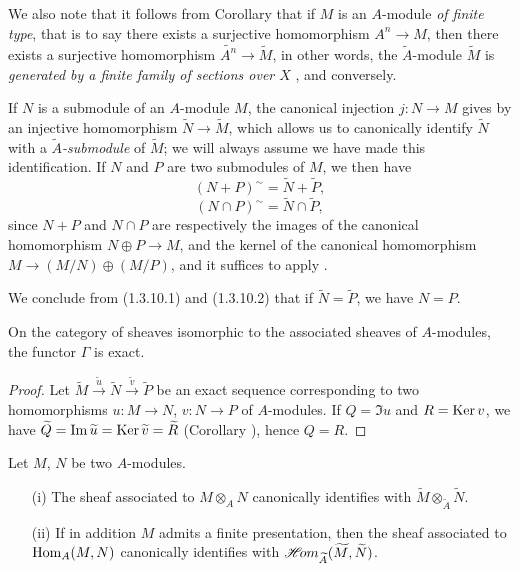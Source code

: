 We also note that it follows from Corollary  that if $M$ is an $A$-module {\em of
finite type}, that is to say there exists a surjective homomorphism $A^n\to M$, then there
exists a surjective homomorphism $\widetilde{A^n}\to\widetilde{M}$, in other words, the
$\widetilde{A}$-module $\widetilde{M}$ is {\em generated by a finite family of sections over
$X$} , and conversely.

\begin{env}[1.3.10]
\label{1.1.3.10}
If $N$ is a submodule of an $A$-module $M$, the canonical injection $j:N\to M$ gives by
 an injective homomorphism $\widetilde{N}\to\widetilde{M}$, which allows us
to canonically identify $\widetilde{N}$ with a {\em $\widetilde{A}$-submodule} of
$\widetilde{M}$; we will always assume we have made this identification. If $N$ and $P$ are
two submodules of $M$, we then have
\[
  (N+P)^\sim=\widetilde{N}+\widetilde{P},
  \tag{1.3.10.1}
\]
\[
  (N\cap P)^\sim=\widetilde{N}\cap\widetilde{P},
  \tag{1.3.10.2}
\]
since $N+P$ and $N\cap P$ are respectively the images of the canonical homomorphism
$N\oplus P\to M$, and the kernel of the canonical homomorphism $M\to(M/N)\oplus(M/P)$, and
it suffices to apply .

We conclude from (1.3.10.1) and (1.3.10.2) that if $\widetilde{N}=\widetilde{P}$, we have
$N=P$.
\end{env}

\begin{cor}[1.3.11]
\label{1.1.3.11}
On the category of sheaves isomorphic to the associated sheaves of $A$-modules, the functor
$\Gamma$ is exact.
\end{cor}

\begin{proof}
\label{proof-1.1.3.11}
Let $\widetilde{M}\xrightarrow{\widetilde{u}}\widetilde{N}
\xrightarrow{\widetilde{v}}\widetilde{P}$ be an exact sequence corresponding to two
homomorphisms $u:M\to N$, $v:N\to P$ of $A$-modules. If $Q=\Im u$ and $R={\mathop{\mathrm{Ker}}\nolimits}\, v$, we have
$\widetilde{Q}={\mathop{\mathrm{Im}}\nolimits}\,\widetilde{u}={\mathop{\mathrm{Ker}}\nolimits}\,\widetilde{v}=\widetilde{R}$ (Corollary ),
hence $Q=R$.
\end{proof}

\begin{cor}[1.3.12]
\label{1.1.3.12}
Let $M$, $N$ be two $A$-modules.
\begin{itemize}
  \item[{\rm(i)}] The sheaf associated to $M\otimes_A N$ canonically identifies with
    $\widetilde{M}\otimes_{\widetilde{A}}\widetilde{N}$.
  \item[{\rm(ii)}] If in addition $M$ admits a finite presentation, then the sheaf associated to
    ${\mathop{\mathrm{Hom}}\nolimits}_A(M,N)$ canonically identifies with $\mathscr{H}\!{om}_{\widetilde{A}}(\widetilde{M},\widetilde{N})$.
\end{itemize}
\end{cor}

